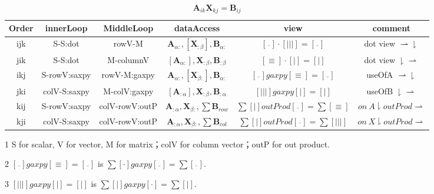 \documentclass[UTF8]{../../09-Mathematics}
\begin{document}
\begin{table}[htbp]
    \newcommand{\tabincell}[2]{\begin{tabular}{@{}#1@{}}#2\end
    {tabular}}
    \centering
    \begin{threeparttable}
    \caption{$\boldsymbol A_{ik} \boldsymbol X_{kj} = \boldsymbol B_{ij}$ }
    \begin{tabular}{cccccc}
        \toprule
        Order & innerLoop & MiddleLoop & dataAccess & view & comment\\
        \midrule
        ijk & S-S:dot & rowV-M 
        & $\boldsymbol A_{\alpha:},[\boldsymbol X_{:\beta}], \boldsymbol B_{\alpha:} $ 
        & $ [\overline{\ \ } ] \cdot [|||] =  [\overline{\ \ } ]$
        & dot view $\rightharpoonup \downharpoonright$ \\

        jik & S-S:dot & M-columnV
        & $[\boldsymbol A_{\alpha:}],\boldsymbol X_{:\beta}, \boldsymbol B_{:\beta} $ 
        & $ [\equiv ] \cdot [|]=  [|]$
        & dot view $ \downharpoonright \rightharpoonup$\\

        ikj & S-rowV:saxpy & rowV-M:gaxpy
        & $\boldsymbol A_{\alpha:},[\boldsymbol X_{\beta:}], \boldsymbol B_{\alpha:} $ 
        & $[\overline{\ \ } ] gaxpy [\equiv ] = [\overline{\ \ } ]$
        & useOfA $\rightharpoonup \downharpoonright$\\

        jki & colV-S:saxpy & M-colV:gaxpy
        & $[\boldsymbol A_{:\alpha}],\boldsymbol X_{:\beta}, \boldsymbol B_{:\alpha} $ 
        & $[||| ] gaxpy [| ] = [| ]$
        & useOfB $ \downharpoonright \rightharpoonup$\\

        kij& S-rowV:saxpy & colV-rowV:outP
        & $\boldsymbol A_{:\alpha},\boldsymbol X_{\beta:},\sum \boldsymbol B_{row} $ 
        & $\sum[| ] outProd [\overline{\ \ } ] =\sum[\equiv ]$
        & $ on \  A \downharpoonright outProd \rightharpoonup$\\

        kji& colV-S:saxpy & colV-rowV:outP
        & $\boldsymbol A_{:\alpha},\boldsymbol X_{\beta:},\sum \boldsymbol B_{col} $ 
        & $\sum[| ] outProd [\overline{\ \ } ] =\sum[||| ]$
        & $on \  X  \downharpoonright outProd \rightharpoonup$\\
        \bottomrule
    \end{tabular}
    \begin{tablenotes}
        \item[1] S for scalar, V for vector, M for matrix；colV for column vector；outP for out product.
        \item[2] $[\overline{\ \ } ] gaxpy [\equiv ] = [\overline{\ \ } ]$ is 
$\sum[\cdot] gaxpy [\overline{\ \ } ] = \sum[\overline{\ \ }]$.
        \item[3] $[||| ] gaxpy [| ] = [| ]$ is $\sum[| ] gaxpy [\cdot] = \sum[| ]$.
      \end{tablenotes}
    \end{threeparttable}
\end{table}
\end{document}
